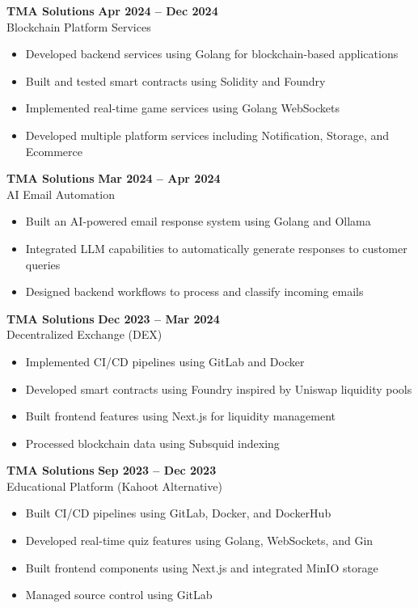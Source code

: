\documentclass{article}
\newenvironment{bullets}{
    \begin{itemize}
    \setlength{\itemsep}{0pt}
    \setlength{\parskip}{0pt}
    \setlength{\parsep}{0pt}
}{
    \end{itemize}
}
\begin{document}
\textbf{TMA Solutions} \hfill \textbf{Apr 2024 – Dec 2024}\\
Blockchain Platform Services
\begin{bullets}
    \item Developed backend services using Golang for blockchain-based applications
    \item Built and tested smart contracts using Solidity and Foundry
    \item Implemented real-time game services using Golang WebSockets
    \item Developed multiple platform services including Notification, Storage, and Ecommerce
\end{bullets}


\textbf{TMA Solutions} \hfill \textbf{Mar 2024 – Apr 2024}\\
AI Email Automation
\begin{bullets}
    \item Built an AI-powered email response system using Golang and Ollama
    \item Integrated LLM capabilities to automatically generate responses to customer queries
    \item Designed backend workflows to process and classify incoming emails
\end{bullets}


\textbf{TMA Solutions} \hfill \textbf{Dec 2023 – Mar 2024}\\
Decentralized Exchange (DEX)
\begin{bullets}
    \item Implemented CI/CD pipelines using GitLab and Docker
    \item Developed smart contracts using Foundry inspired by Uniswap liquidity pools
    \item Built frontend features using Next.js for liquidity management
    \item Processed blockchain data using Subsquid indexing
\end{bullets}


\textbf{TMA Solutions} \hfill \textbf{Sep 2023 – Dec 2023}\\
Educational Platform (Kahoot Alternative)
\begin{bullets}
    \item Built CI/CD pipelines using GitLab, Docker, and DockerHub
    \item Developed real-time quiz features using Golang, WebSockets, and Gin
    \item Built frontend components using Next.js and integrated MinIO storage
    \item Managed source control using GitLab
\end{bullets}
\end{document}

